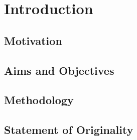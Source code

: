 
\inbpdocument

\chapter{Introduction}
\label{cha:introduction}


\section{Motivation}
\label{sec:motivation}


\section{Aims and Objectives}
\label{sec:objectives}

\section{Methodology}
\label{sec:methodology}


\section{Statement of Originality}
%
%

\outbpdocument{
    
    
}
